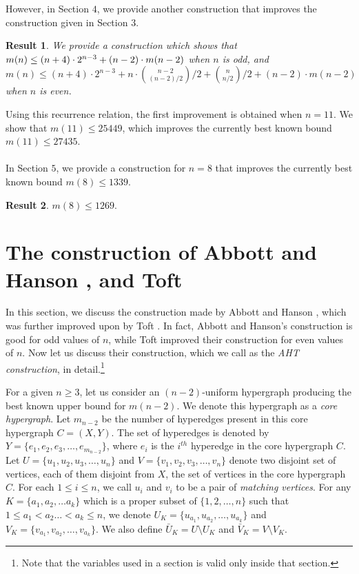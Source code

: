\documentclass[11pt]{article}
\newtheorem{result}{Result}
\begin{document}
\noindent However, in Section $4$, we provide another construction that improves the construction given in Section $3$.

\begin{result}
We provide a construction which shows that $m(n) \leq (n+4) \cdot 2^{n-3} + \linebreak (n-2) \cdot m(n-2)$ when $n$ is odd, and $m(n) \leq (n+4) \cdot 2^{n-3} +
n \cdot {n-2 \choose {(n-2)/2}}/{2} + {n \choose {n / 2}}/{2} + (n-2) \cdot m(n-2)$ when $n$ is even.
\end{result}

\noindent Using this recurrence relation, the first improvement is obtained when $n=11$. We show that $m(11) \leq 25449$, which improves the currently best known bound $m(11) \leq 27435$. \\\\
In Section $5$, we provide a construction for $n=8$ that improves the currently best known bound $m(8) \leq 1339$.
\begin{result}
$m(8) \leq 1269.$
\end{result}

\section{The construction of Abbott and Hanson \cite{Abbott}, and Toft \cite{toft2}}

In this section, we discuss the construction made by Abbott and Hanson \cite{Abbott}, which was further improved upon by Toft \cite{toft2}. In fact, Abbott and Hanson's \cite{Abbott} construction is good for odd values of $n$, while Toft \cite{toft2} improved their construction for even values of $n$. Now let us discuss their construction, which we call as the {\it AHT construction}, in detail.\footnote{Note that the variables used in a section is valid only inside that section.} 


For a given $n \geq 3$, let us consider an $(n-2)$-uniform hypergraph producing the best known upper bound for $m(n-2)$. We denote this hypergraph as a {\it core hypergraph}. Let $m_{n-2}$ be the number of hyperedges present in this core hypergraph $C =(X, Y)$. The set of hyperedges is denoted by 
$Y = \{e_1, e_2, e_3, \ldots, e_{m_{n-2}}\}$, where $e_i$ is the $i^{th}$ hyperedge in the core hypergraph $C$. 
Let $U = \{u_1, u_2, u_3, \ldots, u_n\}$ and $V = \{v_1, v_2, v_3, \ldots, v_n\}$ denote two disjoint set of vertices, each of them disjoint from $X$, the set of vertices in the core hypergraph $C$.
For each $1 \leq i \leq n$, we call $u_i$ and $v_i$ to be a pair of {\it matching vertices}. For any $K =  \{a_1, a_2, \ldots a_k\}$ which is a proper subset of $\{1, 2, \ldots, n\}$ such that $1 \leq a_1 < a_2 \ldots < a_k \leq n$, we denote $U_K = \{u_{a_1}, u_{a_2}, \ldots, u_{a_k}\}$ and $V_K = \{v_{a_1}, v_{a_2}, \ldots, v_{a_k}\}$. We also define 
${\bar{U}}_K = U \setminus U_K$ and ${\bar{V}}_K = V \setminus V_K$.
\end{document}
